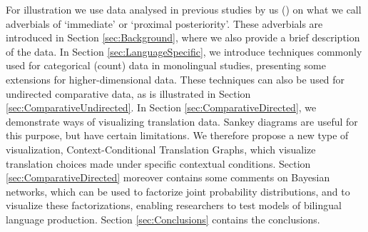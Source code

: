 For illustration we use data analysed in previous studies by us
(\citealt{Atayanetal2019,GastAtayan2019,Gastetal2019,Atayan2021b,Atayan2021a})
on what we call adverbials of `immediate' or `proximal posteriority'. These
adverbials are introduced in Section \ref{sec:Background}, where we
also provide a brief description of the data.
%
In Section \ref{sec:LanguageSpecific}, we introduce techniques
commonly used for categorical (count) data in monolingual studies,
presenting some extensions for higher-dimensional data.
%
These techniques can also be used for undirected comparative data, as
is illustrated in Section \ref{sec:ComparativeUndirected}.
%
In Section \ref{sec:ComparativeDirected}, we demonstrate ways of
visualizing translation data. Sankey diagrams are useful for this
purpose, but have certain limitations. We therefore propose a new
type of visualization, Context-Conditional Translation Graphs, which
visualize translation choices made under specific contextual
conditions.
%
Section \ref{sec:ComparativeDirected} moreover contains some comments
on Bayesian networks, which can be used to factorize joint probability
distributions, and to visualize these factorizations, enabling
researchers to test models of bilingual language production. Section
\ref{sec:Conclusions} contains the conclusions.

